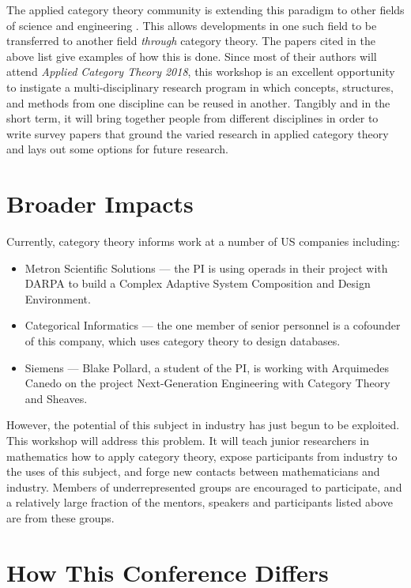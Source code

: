 \documentclass[12pt]{amsart}
\begin{document}
The applied category theory community is extending this paradigm to other fields of science and engineering \cite{spivak14}.  This allows developments in one such field to be transferred to another field \emph{through} category theory.  The papers cited in the above list give examples of how this is done.  Since most of their authors will attend \textsl{Applied Category Theory 2018}, this workshop is an excellent opportunity to instigate a multi-disciplinary research program in which concepts, structures, and methods from one discipline can be reused in another. Tangibly and in the short term, it will bring together people from different disciplines in order to write survey papers that ground the varied research in applied category theory and lays out some options for future research.

\section{Broader Impacts}
 
Currently, category theory informs work at a number of US companies including:

\begin{itemize} 
\item Metron Scientific Solutions --- the PI is using operads in their project with DARPA to build a Complex Adaptive System Composition and Design Environment.
\item Categorical Informatics --- the one member of senior personnel is a cofounder of this company, which uses category theory to design databases.
\item Siemens --- Blake Pollard, a student of the PI, is working with Arquimedes Canedo on the project Next-Generation Engineering with Category Theory and Sheaves.
\end{itemize}   

However, the potential of this subject in industry has just begun to be exploited.  This workshop will address this problem.  It will teach junior researchers in mathematics how to apply category theory, expose participants from industry to the uses of this subject, and forge new contacts between mathematicians and industry.  Members of underrepresented groups are encouraged to participate,
and a relatively large fraction of the mentors, speakers and participants listed above are from these groups.

\section{How This Conference Differs}
\end{document}
